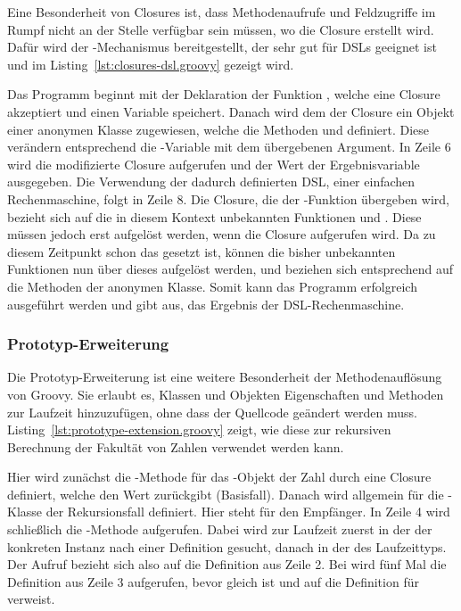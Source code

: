 Eine Besonderheit von Closures ist, dass Methodenaufrufe und Feldzugriffe im Rumpf nicht an der Stelle verfügbar sein müssen, wo die Closure erstellt wird.
Dafür wird der -Mechanismus bereitgestellt, der sehr gut für DSLs geeignet ist und im Listing~\ref{lst:closures-dsl.groovy} gezeigt wird.


Das Programm beginnt mit der Deklaration der Funktion , welche eine Closure akzeptiert und einen Variable  speichert.
Danach wird dem  der Closure ein Objekt einer anonymen Klasse zugewiesen, welche die Methoden  und  definiert.
Diese verändern entsprechend die -Variable mit dem übergebenen Argument.
In Zeile 6 wird die modifizierte Closure aufgerufen und der Wert der Ergebnisvariable ausgegeben.
Die Verwendung der dadurch definierten DSL, einer einfachen Rechenmaschine, folgt in Zeile 8.
Die Closure, die der -Funktion übergeben wird, bezieht sich auf die in diesem Kontext unbekannten Funktionen  und .
Diese müssen jedoch erst aufgelöst werden, wenn die Closure aufgerufen wird.
Da zu diesem Zeitpunkt schon das  gesetzt ist, können die bisher unbekannten Funktionen nun über dieses aufgelöst werden, und beziehen sich entsprechend auf die Methoden der anonymen Klasse.
Somit kann das Programm erfolgreich ausgeführt werden und gibt  aus, das Ergebnis der DSL-Rechenmaschine.

\subsubsection{Prototyp-Erweiterung}

Die Prototyp-Erweiterung ist eine weitere Besonderheit der Methodenauflösung von Groovy.
Sie erlaubt es, Klassen und Objekten Eigenschaften und Methoden zur Laufzeit hinzuzufügen, ohne dass der Quellcode geändert werden muss.
Listing~\ref{lst:prototype-extension.groovy} zeigt, wie diese zur rekursiven Berechnung der Fakultät von Zahlen verwendet werden kann.


Hier wird zunächst die -Methode für das -Objekt der Zahl  durch eine Closure definiert, welche den Wert  zurückgibt (Basisfall).
Danach wird allgemein für die -Klasse der Rekursionsfall definiert.
Hier steht  für den Empfänger.
In Zeile 4 wird schließlich die -Methode aufgerufen.
Dabei wird zur Laufzeit zuerst in der  der konkreten Instanz nach einer Definition gesucht, danach in der  des Laufzeittyps.
Der Aufruf  bezieht sich also auf die Definition aus Zeile 2.
Bei  wird fünf Mal die Definition aus Zeile 3 aufgerufen, bevor  gleich  ist und  auf die Definition für  verweist.


